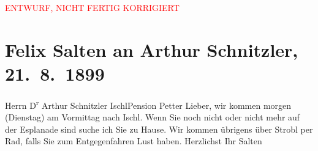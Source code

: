 
\begin{center}
            \textcolor{red}{ENTWURF, NICHT FERTIG KORRIGIERT}
                      \end{center}
            
         \renewcommand{\erwaehnteOrte}{Orte: Bad Ischl, Esplanade, Hotel und Pension Rudolfshöhe (Leopold Petter), Strobl, Unterach am Attersee}
         \renewcommand{\erwaehnteWerke}{}
               \section[Felix Salten an Arthur Schnitzler, 21. 8. 1899]{ Felix Salten an Arthur Schnitzler, 21. 8. 1899}\nopagebreak{}\rehead{ }\begin{ledgroupsized}[t]{13cm}\normalsize\beginnumbering \toendnotes[C]{\smallbreak\pagebreak[2]} 
\pstart{}{\pb}Herrn D\textsuperscript{r} Arthur Schnitzler \pend{}\pstart{}Ischl\pend{}\pstart{}Pension Petter\pend{}{\bigskip}\pstart
           \noindent{}{\pb}Lieber, wir kommen morgen (Dienstag) am
                  Vormittag nach Ischl. Wenn Sie
               noch nicht oder nicht mehr auf der Esplanade
               sind suche ich Sie zu Hause. Wir kommen übrigens über Strobl per Rad, falls Sie zum Entgegenfahren Lust haben.\pend
           \pstart Herzlichst Ihr \spacefill\mbox{Salten}\pend{}
         
         \endnumbering{}\end{ledgroupsized}\begin{anhang}\end{anhang}\newcommand{\dateiname}{L03298}\newcommand{\titel}{Felix Salten an Arthur Schnitzler, 21. 8. 1899}\newcommand{\editorInnen}{Martin Anton Müller und Laura Untner}
      